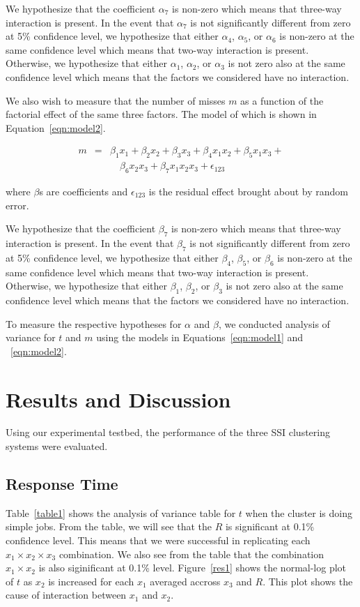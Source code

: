 \documentclass[preprint]{acm_proc_article-sp}
\begin{document}
We hypothesize that the coefficient $\alpha_7$ is non-zero which means that three-way interaction is present. In the event that $\alpha_7$ is not significantly different from zero at 5\% confidence level, we hypothesize that either $\alpha_4$, $\alpha_5$, or $\alpha_6$ is non-zero at the same confidence level which means that two-way interaction is present. Otherwise, we hypothesize that either $\alpha_1$, $\alpha_2$, or $\alpha_3$ is not zero also at the same confidence level which means that the factors we considered have no interaction.

We also wish to measure that the number of misses $m$ as a function of the factorial effect of the same three factors. The model of which is shown in Equation~\ref{eqn:model2}.

\begin{eqnarray}
	m &=& \beta_1x_1+\beta_2x_2+\beta_3x_3+\beta_4x_1x_2+\beta_5x_1x_3+\nonumber\\
            & & \quad\beta_6x_2x_3+\beta_7x_1x_2x_3+\epsilon_{123} \label{eqn:model2}
\end{eqnarray}

where $\beta$s are coefficients and $\epsilon_{123}$ is the residual effect brought about by random error.

We hypothesize that the coefficient $\beta_7$ is non-zero which means that three-way interaction is present. In the event that $\beta_7$ is not significantly different from zero at 5\% confidence level, we hypothesize that either $\beta_4$, $\beta_5$, or $\beta_6$ is non-zero at the same confidence level which means that two-way interaction is present. Otherwise, we hypothesize that either $\beta_1$, $\beta_2$, or $\beta_3$ is not zero also at the same confidence level which means that the factors we considered have no interaction.

To measure the respective hypotheses for $\alpha$ and $\beta$, we conducted analysis of variance for $t$ and $m$ using the models in Equations~\ref{eqn:model1} and ~\ref{eqn:model2}.

\section{Results and Discussion}
Using our experimental testbed, the performance of the three SSI clustering systems were evaluated.

\subsection{Response Time}
Table~\ref{table1} shows the analysis of variance table for $t$ when the cluster is doing simple jobs. From the table, we will see that the $R$ is significant at 0.1\% confidence level. This means that we were successful in replicating each ${x_1}\times{x_2}\times{x_3}$ combination. We also see from the table that the combination ${x_1}\times{x_2}$ is also siginificant at 0.1\% level. Figure~\ref{res1} shows the normal-log plot of $t$ as $x_2$ is increased for each $x_1$ averaged accross $x_3$ and $R$. This plot shows the cause of interaction between $x_1$ and $x_2$.
\end{document}
